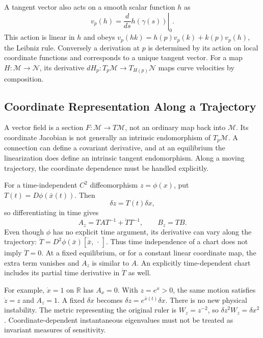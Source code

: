 A tangent vector also acts on a smooth scalar function $h$ as
\begin{equation}
v_p(h)=\left.\frac{d}{ds}h(\gamma(s))\right|_0.
\label{eq:ch1:tangent-derivative}
\end{equation}
This action is linear in $h$ and obeys $v_p(hk)=h(p)v_p(k)+k(p)v_p(h)$, the Leibniz
rule. Conversely a derivation at $p$ is determined by its action on local coordinate
functions and corresponds to a unique tangent vector. For a map $H:\mathcal M\to\mathcal N$,
its derivative $dH_p:T_p\mathcal M\to T_{H(p)}\mathcal N$ maps curve velocities by composition.

\subsection{Coordinate Representation Along a Trajectory}

A vector field is a section $F:\mathcal M\to T\mathcal M$, not an ordinary map back into
$\mathcal M$. Its coordinate Jacobian is not generally an intrinsic endomorphism of
$T_p\mathcal M$. A connection can define a covariant derivative, and at an equilibrium
the linearization does define an intrinsic tangent endomorphism. Along a moving trajectory,
the coordinate dependence must be handled explicitly.

For a time-independent $C^2$ diffeomorphism $z=\phi(x)$, put $T(t)=D\phi(\bar x(t))$. Then
\begin{equation}
\delta z=T(t)\delta x,
\label{eq:ch1:tangent-transform}
\end{equation}
so differentiating in time gives
\begin{equation}
A_z=TAT^{-1}+\dot TT^{-1},\qquad B_z=TB.
\label{eq:ch1:jacobian-transform}
\end{equation}
Even though $\phi$ has no explicit time argument, its derivative can vary along the
trajectory: $\dot T=D^2\phi(\bar x)[\dot{\bar x},\,\cdot\,]$. Thus time independence
of a chart does not imply $\dot T=0$. At a fixed equilibrium, or for a constant linear
coordinate map, the extra term vanishes and $A_z$ is similar to $A$. An explicitly
time-dependent chart includes its partial time derivative in $\dot T$ as well.

For example, $\dot x=1$ on $\mathbb R$ has $A_x=0$. With $z=e^x>0$, the same motion
satisfies $\dot z=z$ and $A_z=1$. A fixed $\delta x$ becomes $\delta z=e^{\bar x(t)}\delta x$.
There is no new physical instability. The metric representing the original ruler is
$W_z=z^{-2}$, so $\delta z^2W_z=\delta x^2$. Coordinate-dependent instantaneous eigenvalues
must not be treated as invariant measures of sensitivity.

